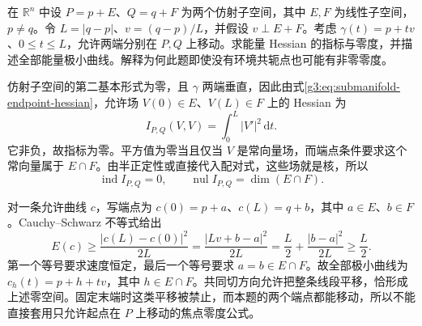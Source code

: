 \begin{exercise}\label{g3:ex:affine-free-endpoint-nullity}
	在 \(\mathbb R^n\) 中设 \(P=p+E\)、\(Q=q+F\) 为两个仿射子空间，其中 \(E,F\) 为线性子空间，\(p\ne q\)。令 \(L=|q-p|\)、\(v=(q-p)/L\)，并假设 \(v\perp E+F\)。考虑 \(\gamma(t)=p+tv\)、\(0\le t\le L\)，允许两端分别在 \(P,Q\) 上移动。求能量 Hessian 的指标与零度，并描述全部能量极小曲线。解释为何此题即使没有环境共轭点也可能有非零零度。
\end{exercise}
\begin{solution}
	仿射子空间的第二基本形式为零，且 \(\gamma\) 两端垂直，因此由式\eqref{g3:eq:submanifold-endpoint-hessian}，允许场 \(V(0)\in E\)、\(V(L)\in F\) 上的 Hessian 为
	\[
		I_{P,Q}(V,V)=\int_0^L|V'|^2\,\mathrm dt.
	\]
	它非负，故指标为零。平方值为零当且仅当 \(V\) 是常向量场，而端点条件要求这个常向量属于 \(E\cap F\)。由半正定性或直接代入配对式，这些场就是核，所以
	\[
		\operatorname{ind}I_{P,Q}=0,\qquad
		\operatorname{nul}I_{P,Q}=\dim(E\cap F).
	\]

	对一条允许曲线 \(c\)，写端点为 \(c(0)=p+a\)、\(c(L)=q+b\)，其中 \(a\in E\)、\(b\in F\)。Cauchy--Schwarz 不等式给出
	\[
		E(c)\ge\frac{|c(L)-c(0)|^2}{2L}
		=\frac{|Lv+b-a|^2}{2L}
		=\frac L2+\frac{|b-a|^2}{2L}\ge\frac L2.
	\]
	第一个等号要求速度恒定，最后一个等号要求 \(a=b\in E\cap F\)。故全部极小曲线为
	\(c_h(t)=p+h+tv\)，其中 \(h\in E\cap F\)。共同切方向允许把整条线段平移，恰形成上述零空间。固定末端时这类平移被禁止，而本题的两个端点都能移动，所以不能直接套用只允许起点在 \(P\) 上移动的焦点零度公式。
\end{solution}
